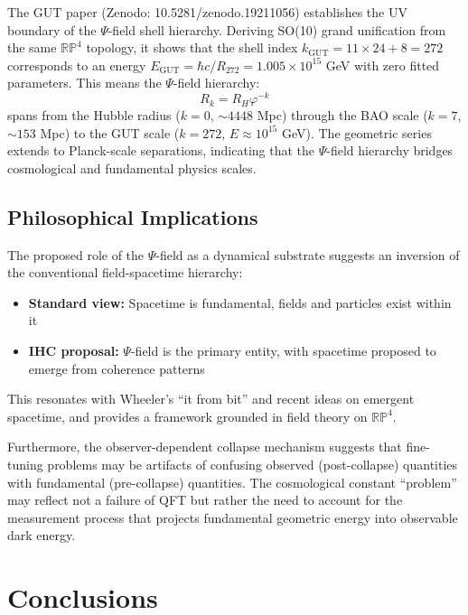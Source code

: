 The GUT paper \citep{Peacock2026c} (Zenodo: 10.5281/zenodo.19211056) establishes the UV boundary of the $\Psi$-field shell hierarchy. Deriving SO(10) grand unification from the same $\mathbb{RP}^4$ topology, it shows that the shell index $k_\mathrm{GUT} = 11 \times 24 + 8 = 272$ corresponds to an energy $E_\mathrm{GUT} = \hbar c / R_{272} = 1.005 \times 10^{15}$ GeV with zero fitted parameters. This means the $\Psi$-field hierarchy:
\begin{equation}
R_k = R_H \varphi^{-k}
\end{equation}
spans from the Hubble radius ($k=0$, $\sim 4448$ Mpc) through the BAO scale ($k=7$, $\sim 153$ Mpc) to the GUT scale ($k=272$, $E \approx 10^{15}$ GeV). The geometric series extends to Planck-scale separations, indicating that the $\Psi$-field hierarchy bridges cosmological and fundamental physics scales.

\subsection{Philosophical Implications}

The proposed role of the $\Psi$-field as a dynamical substrate suggests an inversion of the conventional field-spacetime hierarchy:

\begin{itemize}
\item \textbf{Standard view:} Spacetime is fundamental, fields and particles exist within it
\item \textbf{IHC proposal:} $\Psi$-field is the primary entity, with spacetime proposed to emerge from coherence patterns
\end{itemize}

This resonates with Wheeler's ``it from bit'' \citep{Wheeler1990} and recent ideas on emergent spacetime, and provides a framework grounded in field theory on $\mathbb{RP}^4$.

Furthermore, the observer-dependent collapse mechanism suggests that fine-tuning problems may be artifacts of confusing observed (post-collapse) quantities with fundamental (pre-collapse) quantities. The cosmological constant ``problem'' may reflect not a failure of QFT but rather the need to account for the measurement process that projects fundamental geometric energy into observable dark energy.

\section{Conclusions}


